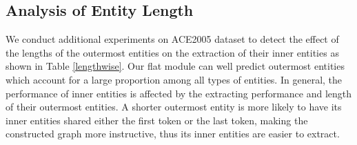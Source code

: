 \documentclass[11pt,a4paper]{article}
\begin{document}
 \begin{table}[!t] 
\centering
{}
\caption{Ablation study on the three benchmark datasets.}
\label{ablation}
\end{table}  


\subsection{Analysis of Entity Length}
We conduct additional experiments on ACE2005 dataset to detect the effect of the lengths of the outermost entities on the extraction of their inner entities as shown in Table \ref{lengthwise}.
Our flat module can well predict outermost entities which account for a large proportion among all types of entities.
In general, the performance of inner entities is affected by  the extracting performance and length of their outermost entities.
A shorter outermost entity is more likely to have its inner entities shared either the first token or the last token, making the constructed graph  more instructive, thus its inner entities are easier to extract.  
\end{document}
